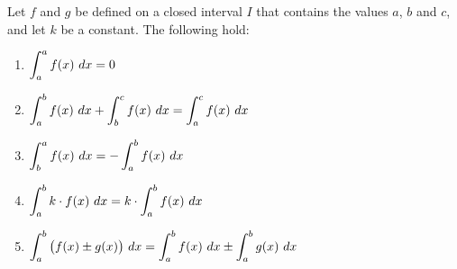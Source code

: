 {Let $f$ and $g$ be defined on a closed interval $I$ that contains the values $a$, $b$ and $c$, and let $k$ be a constant. The following hold:
\begin{enumerate}[1)]
\item $\displaystyle \int_a^a f(x) \ dx = 0$

\item $\displaystyle \int_a^b f(x) \ dx + \int_b^c f(x)\ dx = \int_a^cf(x)\ dx$

\item $\displaystyle \int_b^a f(x) \ dx = -\int_a^b f(x)\ dx$

\item $\displaystyle \int_a^b k \cdot f(x) \ dx = k \cdot \int_a^b f(x) \ dx$

\item $\displaystyle \int_a^b \big( f(x)\pm g(x) \big) \ dx = \int_a^b f(x) \ dx \pm \int_a^b g(x) \ dx$
\end{enumerate}
} %

